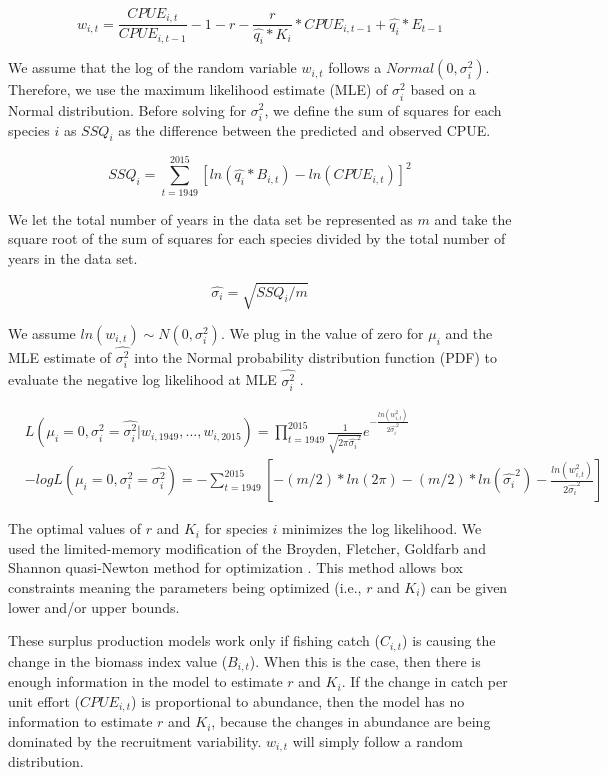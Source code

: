 \documentclass[oneside,12pt,final]{sty/ucthesis-CA2012}
\let\cite\citep                             %
\begin{document}
\begin{mainmatter}
\begin{equation} \label{randomvar}
w_{i,t} = \frac{CPUE_{i,t}}{CPUE_{i,t-1} } -1 - r -\frac{r}{\widehat{q_i}*K_i}*CPUE_{i,t-1}  + \widehat{q_i}*E_{t-1} 
\end{equation}

We assume that the log of the random variable $w_{i,t}$ follows a $Normal(0,\sigma_i^2)$. Therefore, we use the maximum likelihood estimate (MLE) of $\sigma_i^2$ based on a Normal distribution. Before solving for $\sigma_i^2$, we define the sum of squares for each species $i$ as $SSQ_i$ as the difference between the predicted and observed CPUE. 

$$ SSQ_i = \sum_{t=1949}^{2015}[ln(\widehat{q_{i}}*B_{i,t}) - ln(CPUE_{i,t})]^2  $$

We let the total number of years in the data set be represented as $m$ and take the square root of the sum of squares for each species divided by the total number of years in the data set.

$$\widehat{\sigma_i} =\sqrt{SSQ_i/m} $$

We assume $ln(w_{i,t}) \sim N(0,\sigma_i^2)$. We plug in the value of zero for $\mu_i$ and the MLE estimate of $\widehat{\sigma_i^2}$ into the Normal probability distribution function (PDF) to evaluate the negative log likelihood at MLE $\widehat{\sigma_i^2}$ . 

\begin{align} \label{ln_likelihood}
& L(\mu_i=0,\sigma_i^2=\widehat{\sigma_i^2}|w_{i,1949},\dots,w_{i,2015}) = \prod_{t=1949}^{2015} \frac{1}{\sqrt{2\pi\widehat{\sigma_i}^2}}e^{-\frac{ln(w_{i,t}^2)}{2\widehat{\sigma_i}^2}} \\ \label{ln_loglikelihood}
&-logL(\mu_i=0,\sigma_i^2=\widehat{\sigma_i^2}) = - \sum_{t=1949}^{2015} \left[-(m/2)*ln(2\pi) - (m/2)*ln(\widehat{\sigma_i}^2) - \frac{ln(w_{i,t}^2)}{2\widehat{\sigma_i}^2} \right]
\end{align}

The optimal values of $r$ and $K_i$ for species $i$ minimizes the log likelihood. We used the limited-memory modification of the Broyden, Fletcher, Goldfarb and Shannon quasi-Newton method for optimization \cite{shanno1970conditioning,byrd1995limited}. This method allows box constraints meaning the parameters being optimized (i.e., $r$ and $K_i$) can be given lower and/or upper bounds. 

\vspace{5mm}

These surplus production models work only if fishing catch ($C_{i,t}$) is causing the change in the biomass index value ($B_{i,t}$). When this is the case, then there is enough information in the model to estimate $r$ and $K_i$. If the change in catch per unit effort ($CPUE_{i,t}$) is proportional to abundance, then the model has no information to estimate $r$ and $K_i$, because the changes in abundance are being dominated by the recruitment variability. $w_{i,t}$ will simply follow a random distribution.



\end{mainmatter}
\end{document}
